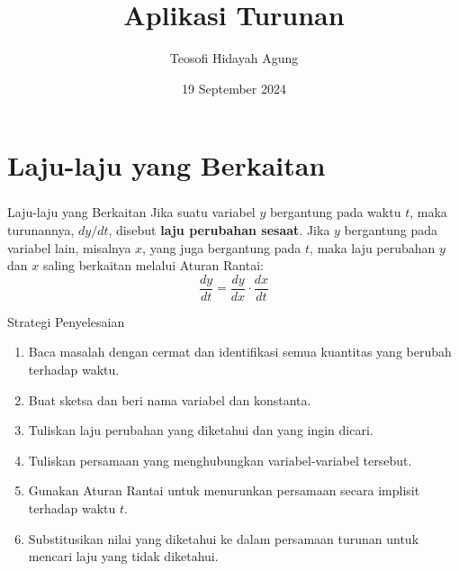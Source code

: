 \documentclass{../../kalkulus-ppt}
\author[Tetew]{Teosofi Hidayah Agung}
\date{19 September 2024}
\title[Kalkulus 1 - Bab 5]{Aplikasi Turunan}
\institute[Matematika ITS]{Departemen Matematika\\ Institut Teknologi Sepuluh Nopember}
\begin{document}
{
\begin{frame}
  \titlepage
\end{frame}
}


\section{Laju-laju yang Berkaitan}
\begin{frame}
  \frametitle{\insertsection}
  \begin{definisi}{Laju-laju yang Berkaitan}
    Jika suatu variabel $y$ bergantung pada waktu $t$, maka turunannya, $dy/dt$, disebut \textbf{laju perubahan sesaat}. Jika $y$ bergantung pada variabel lain, misalnya $x$, yang juga bergantung pada $t$, maka laju perubahan $y$ dan $x$ saling berkaitan melalui Aturan Rantai:
    \[
      \frac{dy}{dt} = \frac{dy}{dx} \cdot \frac{dx}{dt}
    \]
  \end{definisi}

  \begin{block}{Strategi Penyelesaian}
    \begin{enumerate}
      \item Baca masalah dengan cermat dan identifikasi semua kuantitas yang berubah terhadap waktu.
      \item Buat sketsa dan beri nama variabel dan konstanta.
      \item Tuliskan laju perubahan yang diketahui dan yang ingin dicari.
      \item Tuliskan persamaan yang menghubungkan variabel-variabel tersebut.
      \item Gunakan Aturan Rantai untuk menurunkan persamaan secara implisit terhadap waktu $t$.
      \item Substitusikan nilai yang diketahui ke dalam persamaan turunan untuk mencari laju yang tidak diketahui.
    \end{enumerate}
  \end{block}
\end{frame}
\end{document}
